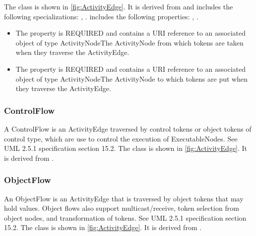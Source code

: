 %
The  class is shown in \ref{fig:ActivityEdge}. It is derived from  and includes the following specializations: , . %
 includes the following properties: , . %
\begin{itemize}%
\item%
The  property is REQUIRED and contains a URI reference to an associated object of type ActivityNodeThe ActivityNode from which tokens are taken when they traverse the ActivityEdge.%
\item%
The  property is REQUIRED and contains a URI reference to an associated object of type ActivityNodeThe ActivityNode to which tokens are put when they traverse the ActivityEdge.%
\end{itemize}%
\subsubsection{ControlFlow}%
\label{sec:uml:ControlFlow}%
A ControlFlow is an ActivityEdge traversed by control tokens or object tokens of control type, which are use to control the execution of ExecutableNodes. See UML 2.5.1 specification section 15.2.%
\linebreak%
\linebreak%
The  class is shown in \ref{fig:ActivityEdge}. It is derived from .%
%
\subsubsection{ObjectFlow}%
\label{sec:uml:ObjectFlow}%
An ObjectFlow is an ActivityEdge that is traversed by object tokens that may hold values. Object flows also support multicast/receive, token selection from object nodes, and transformation of tokens. See UML 2.5.1 specification section 15.2.%
\linebreak%
\linebreak%
The  class is shown in \ref{fig:ActivityEdge}. It is derived from .%

%
